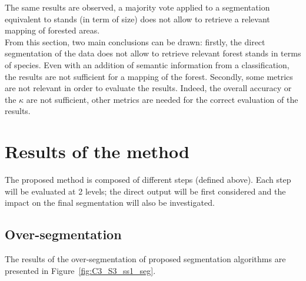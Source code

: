The same results are observed, a majority vote applied to a segmentation equivalent to stands (in term of size) does not allow to retrieve a relevant mapping of forested areas. \\

From this section, two main conclusions can be drawn: firstly, the direct segmentation of the data does not allow to retrieve relevant forest stands in terms of species. Even with an addition of semantic information from a classification, the results are not sufficient for a mapping of the forest. Secondly, some metrics are not relevant in order to evaluate the results. Indeed, the overall accuracy or the $\kappa$ are not sufficient, other metrics are needed for the correct evaluation of the results.

\section{Results of the method}
The proposed method is composed of different steps (defined above). Each step will be evaluated at 2 levels; the direct output will be first considered and the impact on the final segmentation will also be investigated.
\subsection{Over-segmentation}
The results of the over-segmentation of proposed segmentation algorithms are presented in Figure~\ref{fig:C3_S3_ss1_seg}.

